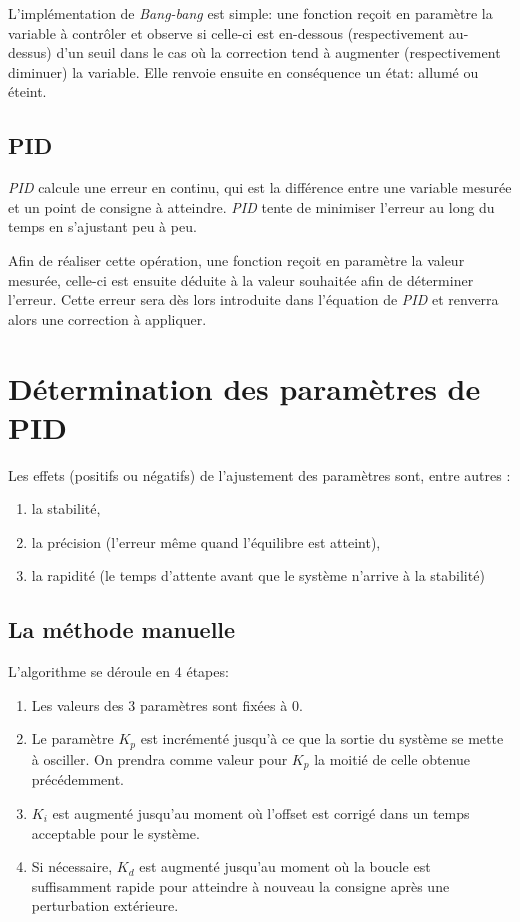 \documentclass[a4paper,10pt]{report}
\begin{document}
L'implémentation de \emph{Bang-bang} est simple: une fonction reçoit en paramètre la variable à contrôler et observe si celle-ci est en-dessous (respectivement au-dessus) d'un seuil dans le cas où la correction tend à augmenter (respectivement diminuer) la variable. Elle renvoie ensuite en conséquence un état: allumé ou éteint.

\subsection{PID}

\emph{PID} calcule une erreur en continu, qui est la différence entre une variable mesurée et un point de consigne à atteindre.
\emph{PID} tente de minimiser l'erreur au long du temps en s'ajustant peu à peu.

Afin de réaliser cette opération, une fonction reçoit en paramètre la valeur mesurée, celle-ci est ensuite déduite à la valeur souhaitée afin de déterminer l'erreur. Cette erreur sera dès lors introduite dans l'équation de \emph{PID} et renverra alors une correction à appliquer.

\section{Détermination des paramètres de PID} %
Les effets (positifs ou négatifs) de l'ajustement des paramètres sont, entre autres \cite{zhong2006pid} :
\begin{enumerate}
\item la stabilité,
\item la précision (l'erreur même quand l'équilibre est atteint),
\item la rapidité (le temps d'attente avant que le système n'arrive à la stabilité)
\end{enumerate}

\subsection{La méthode manuelle}

L'algorithme se déroule en 4 étapes:
\begin{enumerate}
    \item Les valeurs des 3 paramètres sont fixées à $0$.
    \item Le paramètre $K_p$ est incrémenté jusqu'à ce que la sortie du système se mette à osciller.
    On prendra comme valeur pour $K_p$ la moitié de celle obtenue précédemment.
    \item $K_i$ est augmenté jusqu'au moment où l'offset est corrigé dans un temps acceptable pour le système.
    \item Si nécessaire, $K_d$ est augmenté jusqu'au moment où la boucle est suffisamment rapide pour atteindre à nouveau la consigne après une perturbation extérieure.
\end{enumerate}
\end{document}
